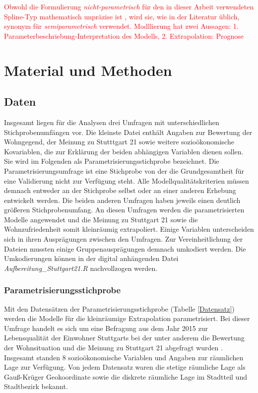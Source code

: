 \documentclass{Vorlage}
\begin{document}
\textcolor{red}{Obwohl die Formulierung \textit{nicht-parametrisch} für den in dieser Arbeit verwendeten Spline-Typ mathematisch unpräzise ist \cite[p. 1]{eilers1996}, wird sie, wie in der Literatur üblich, synonym für \textit{semiparametrisch} verwendet.
Modllierung hat zwei Aussagen: 1. Parameterbeschriebung-Interpretation des Modells, 2. Extrapolation: Prognose}

\newpage

\section{Material und Methoden}
\subsection{Daten}
Insgesamt liegen für die Analysen drei Umfragen mit unterschiedlichen Stichprobenumfängen vor. Die kleinste Datei 
enthält Angaben zur Bewertung der Wohngegend, der Meinung zu Stutttgart 21 sowie weitere sozioökonomische Kovariablen, 
die zur Erklärung der beiden abhängigen Variablen dienen sollen. Sie wird im Folgenden als 
Parametrisierungsstichprobe bezeichnet. Die Parametrisierungsumfrage ist eine Stichprobe von 
der die Grundgesamtheit für eine Validierung nicht zur Verfügung steht. Alle Modellqualitätskriterien müssen 
demnach entweder an der Stichprobe selbst oder an einer anderen Erhebung entwickelt werden. Die beiden anderen 
Umfragen haben jeweils einen deutlich größeren Stichprobenumfang. An diesen Umfragen werden die parametrisierten 
Modelle angewendet und die Meinung zu Stuttgart 21 sowie die Wohnzufriedenheit somit kleinräumig extrapoliert. Einige 
Variablen unterscheiden sich in ihren Ausprägungen zwischen den Umfragen. Zur Vereinheitlichung der Dateien mussten 
einige Gruppenausprägungen demnach umkodiert werden. Die Umkodierungen können in der digital anhängenden Datei 
\textit{Aufbereitung\_Stuttgart21.R} nachvollzogen werden.

\subsubsection{Parametrisierungsstichprobe}
Mit den Datensätzen der Parametrisierungsstichprobe (Tabelle \ref{Datensatz}) werden die Modelle für die kleinräumige 
Extrapolation parametrisiert. Bei dieser Umfrage handelt es sich um eine Befragung aus dem Jahr 2015 zur Lebensqualität 
der Einwohner Stuttgarts bei der unter anderem die Bewertung der Wohnsituation und die Meinung zu Stuttgart 21 abgefragt 
wurden \cite{Stuttgart2015}. Insgesamt standen 8 sozioökonomische Variablen und Angaben zur räumlichen Lage zur 
Verfügung. Von jedem Datensatz waren die stetige räumliche Lage als Gauß-Krüger Geokoordinate sowie die diskrete räumliche 
Lage im Stadtteil und Stadtbezirk bekannt.\\
\end{document}
